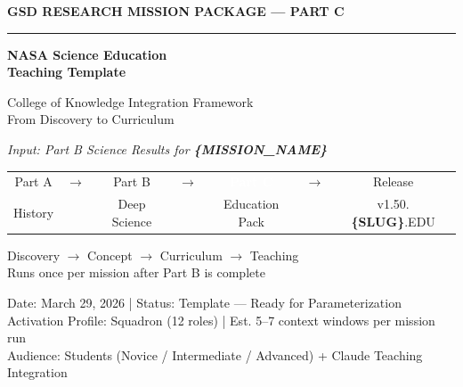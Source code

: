 \documentclass[11pt,letterpaper]{article}
\newcommand{\param}[1]{\textcolor{paramred}{\textbf{\{#1\}}}}
\begin{document}
\thispagestyle{empty}
\begin{center}
\vspace*{2cm}

{\small\sffamily\textcolor{primary}{\textbf{GSD RESEARCH MISSION PACKAGE --- PART C}}}

\vspace{0.3cm}
\textcolor{bordergray}{\rule{9cm}{0.4pt}}

\vspace{1.2cm}
{\fontsize{24}{30}\selectfont\bfseries\sffamily\textcolor{primary}{NASA Science Education\\[0.3em]Teaching Template}}

\vspace{0.6cm}
{\Large\sffamily\textcolor{secondary}{College of Knowledge Integration Framework}}\\[0.3em]
{\large\sffamily\textcolor{tertiary}{From Discovery to Curriculum}}

\vspace{0.5cm}
{\large\sffamily\itshape\textcolor{accent}{Input: Part B Science Results for \param{MISSION\_NAME}}}

\vspace{1.8cm}
\begin{center}
\begin{tabular}{ccccccc}
{\small\sffamily\textcolor{subtlegray}{Part A}} &
{\small\sffamily\textcolor{subtlegray}{$\to$}} &
{\small\sffamily\textcolor{subtlegray}{Part B}} &
{\small\sffamily\textcolor{subtlegray}{$\to$}} &
\colorbox{secondary}{\textcolor{white}{\small\bfseries\sffamily\ Part C\ }} &
{\small\sffamily\textcolor{subtlegray}{$\to$}} &
{\small\sffamily\textcolor{subtlegray}{Release}}\\
{\tiny\sffamily\textcolor{subtlegray}{History}} & &
{\tiny\sffamily\textcolor{subtlegray}{Deep Science}} & &
{\tiny\sffamily\textcolor{subtlegray}{Education Pack}} & &
{\tiny\sffamily\textcolor{subtlegray}{v1.50.\param{SLUG}.EDU}}
\end{tabular}
\end{center}

\vspace{1.8cm}
{\sffamily\textcolor{accent}{Discovery $\rightarrow$ Concept $\rightarrow$ Curriculum $\rightarrow$ Teaching}}\\[0.3em]
{\small\sffamily\textcolor{accent}{Runs once per mission after Part B is complete}}

\vspace{1.8cm}
{\small\sffamily\textcolor{subtlegray}{Date: March 29, 2026  |  Status: Template — Ready for Parameterization}}\\[0.3em]
{\small\sffamily\textcolor{subtlegray}{Activation Profile: Squadron (12 roles)  |  Est. 5--7 context windows per mission run}}\\[0.3em]
{\small\sffamily\textcolor{subtlegray}{Audience: Students (Novice / Intermediate / Advanced) + Claude Teaching Integration}}
\end{center}
\newpage
\end{document}
